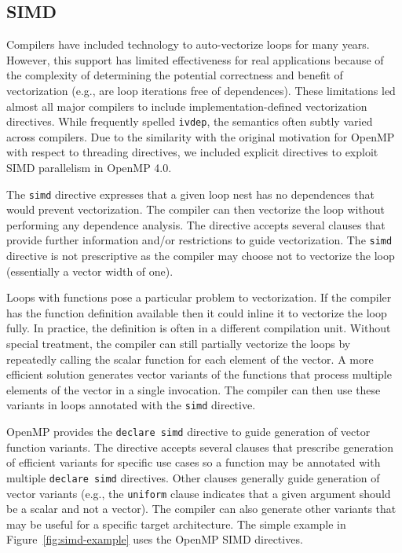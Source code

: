 \subsection{SIMD}
\label{sub:simd}

Compilers have included technology to auto-vectorize loops for many years. 
However, this support has limited effectiveness for real applications because 
of the complexity of determining the potential correctness and benefit of 
vectorization (e.g., are loop iterations free of dependences). These 
limitations led almost all major compilers to include implementation-defined 
vectorization directives. While frequently spelled \texttt{ivdep}, the
semantics often subtly varied across compilers. Due to the similarity 
with the original motivation for OpenMP with respect to threading 
directives, we included explicit directives to exploit SIMD parallelism 
in OpenMP 4.0.

The \texttt{simd} directive expresses that a given loop nest has no
dependences that would prevent vectorization. The compiler can then 
vectorize the loop without performing any dependence analysis. The 
directive accepts several clauses that provide further information 
and/or restrictions to guide vectorization. The \texttt{simd} directive 
is not prescriptive as the compiler may choose not to vectorize the 
loop (essentially a vector width of one).

Loops with functions pose a particular problem to vectorization. If the 
compiler has the function definition available then it could inline it 
to vectorize the loop fully. In practice, the definition is often in a
different compilation unit. Without special treatment, the compiler can
still partially vectorize the loops by repeatedly calling the scalar 
function for each element of the vector. A more efficient solution 
generates vector variants of the functions that process multiple 
elements of the vector in a single invocation. The compiler can then
use these variants in loops annotated with the \texttt{simd} directive.

OpenMP provides the \texttt{declare simd} directive to guide generation
of vector function variants. The directive accepts several clauses that
prescribe generation of efficient variants for specific use cases so a
function may be annotated with multiple \texttt{declare simd} directives.
Other clauses generally guide generation of vector variants (e.g., the 
\texttt{uniform} clause indicates that a given argument should be a 
scalar and not a vector). The compiler can also generate other variants 
that may be useful for a specific target architecture. The simple example 
in Figure~\ref{fig:simd-example} uses the OpenMP SIMD directives.

